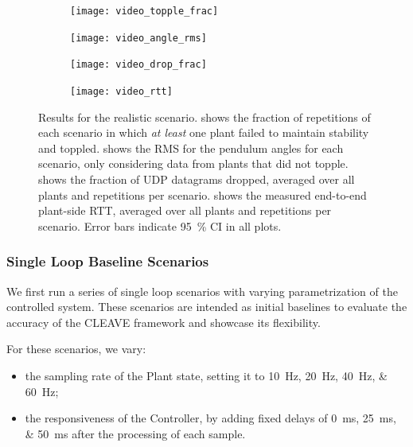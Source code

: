 \begin{figure}[t]
    \centering
    \begin{subfigure}[h]{.25\textwidth}
        \centering
        \texttt{[image: video\_topple\_frac]}
        \caption{}\label{fig:video:toppled}
    \end{subfigure}%
    \begin{subfigure}[h]{.25\textwidth}
        \centering
        \texttt{[image: video\_angle\_rms]}
        \caption{}\label{fig:video:rms}
    \end{subfigure}%
    \begin{subfigure}[h]{.25\textwidth}
        \centering
        \texttt{[image: video\_drop\_frac]}
        \caption{}\label{fig:video:drop}
    \end{subfigure}%
    \begin{subfigure}[h]{.25\textwidth}
        \centering
        \texttt{[image: video\_rtt]}
        \caption{}\label{fig:video:rtt}
    \end{subfigure}%
    \caption{
        Results for the realistic scenario.
         shows the fraction of repetitions of each scenario in which \emph{at least} one plant failed to maintain stability and toppled.
         shows the \ac{RMS} for the pendulum angles for each scenario, only considering data from plants that did not topple.
         shows the fraction of \ac{UDP} datagrams dropped, averaged over all plants and repetitions per scenario.
         shows the measured end-to-end plant-side \ac{RTT}, averaged over all plants and repetitions per scenario.
        Error bars indicate \SI{95}{\percent} \ac{CI} in all plots.
    }\label{fig:video:results}
\end{figure}

\subsubsection{Single Loop Baseline Scenarios}

We first run a series of single loop scenarios with varying parametrization of the controlled system.
These scenarios are intended as initial baselines to evaluate the accuracy of the \ac{CLEAVE} framework and showcase its flexibility.

For these scenarios, we vary:
\begin{itemize}
    \item the sampling rate of the Plant state, setting it to \SIlist[list-final-separator={, or }]{10;20;40;60}{\hertz};
    \item the responsiveness of the Controller, by adding fixed delays of  \SIlist[list-final-separator={, or }]{0;25;50}{\milli\second} after the processing of each sample.
\end{itemize}

